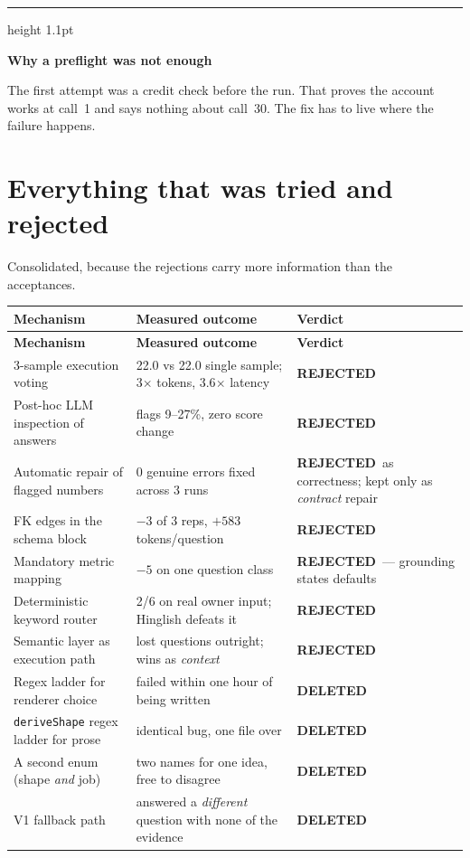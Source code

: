 \documentclass[11pt,a4paper]{report}
\newcommand{\code}[1]{\texttt{\small #1}}
\newenvironment{keybox}[1]
 {\par\medskip\begin{center}\begin{minipage}{0.94\textwidth}%
  {\color{navy}\hrule height 1.1pt}\vspace{5pt}\par
  \textbf{\color{navy}#1}\par\vspace{3pt}\small}
 {\par\vspace{5pt}{\color{mist}\hrule height 0.8pt}\end{minipage}\end{center}\medskip}
\newcommand{\verdictN}{{\color{brick}\textbf{REJECTED}}}
\newcommand{\verdictD}{{\color{brick}\textbf{DELETED}}}
\begin{document}
\begin{keybox}{Why a preflight was not enough}
The first attempt was a credit check before the run. That proves the account works at call~1 and
says nothing about call~30. The fix has to live where the failure happens.
\end{keybox}

\section{Everything that was tried and rejected}

Consolidated, because the rejections carry more information than the acceptances.

\begin{center}
\small
\begin{longtable}{@{}p{4.6cm}p{7.2cm}p{2.6cm}@{}}
\toprule
\textbf{Mechanism} & \textbf{Measured outcome} & \textbf{Verdict}\\
\midrule
\endfirsthead
\toprule
\textbf{Mechanism} & \textbf{Measured outcome} & \textbf{Verdict}\\
\midrule
\endhead
3-sample execution voting & 22.0 vs 22.0 single sample; 3$\times$ tokens, 3.6$\times$ latency & \verdictN\\
Post-hoc LLM inspection of answers & flags 9--27\%, zero score change & \verdictN\\
Automatic repair of flagged numbers & 0 genuine errors fixed across 3 runs & \verdictN\ as correctness; kept only as \emph{contract} repair\\
FK edges in the schema block & $-3$ of 3 reps, $+583$ tokens/question & \verdictN\\
Mandatory metric mapping & $-5$ on one question class & \verdictN\ --- grounding states defaults\\
Deterministic keyword router & 2/6 on real owner input; Hinglish defeats it & \verdictN\\
Semantic layer as execution path & lost questions outright; wins as \emph{context} & \verdictN\\
Regex ladder for renderer choice & failed within one hour of being written & \verdictD\\
\code{deriveShape} regex ladder for prose & identical bug, one file over & \verdictD\\
A second enum (shape \emph{and} job) & two names for one idea, free to disagree & \verdictD\\
V1 fallback path & answered a \emph{different} question with none of the evidence & \verdictD\\

\end{longtable}
\end{center}
\end{document}

